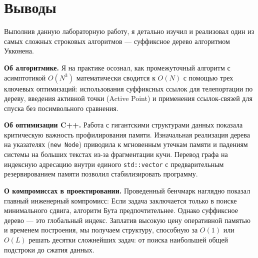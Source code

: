 \section{Выводы}

Выполнив данную лабораторную работу, я детально изучил и реализовал один из самых сложных строковых алгоритмов — суффиксное дерево алгоритмом Укконена.

\textbf{Об алгоритмике.} Я на практике осознал, как промежуточный алгоритм с асимптотикой $O(N^3)$ математически сводится к $O(N)$ с помощью трех ключевых оптимизаций: использования суффиксных ссылок для телепортации по дереву, введения активной точки (Active Point) и применения ссылок-связей для спуска без посимвольного сравнения.

\textbf{Об оптимизации C++.} Работа с гигантскими структурами данных показала критическую важность профилирования памяти. Изначальная реализация дерева на указателях (\texttt{new Node}) приводила к мгновенным утечкам памяти и падениям системы на больших текстах из-за фрагментации кучи. Перевод графа на индексную адресацию внутри единого \texttt{std::vector} с предварительным резервированием памяти позволил стабилизировать программу.

\textbf{О компромиссах в проектировании.} Проведенный бенчмарк наглядно показал главный инженерный компромисс: Если задача заключается только в поиске минимального сдвига, алгоритм Бута предпочтительнее. Однако суффиксное дерево — это глобальный индекс. Заплатив высокую цену оперативной памятью и временем построения, мы получаем структуру, способную за $O(1)$ или $O(L)$ решать десятки сложнейших задач: от поиска наибольшей общей подстроки до сжатия данных.
\pagebreak